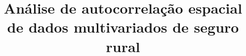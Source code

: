 \documentclass[10pt]{article}
\title{Análise de autocorrelação espacial de dados multivariados de seguro rural}
\date{}
\begin{document}
\maketitle

\begin{abstract}

\end{abstract}


    
%

\begin{singlespace}
\begin{flushleft}
\renewcommand\refname{}
\vspace*{-1.5cm}

\end{flushleft}
\end{singlespace}
\end{document}
